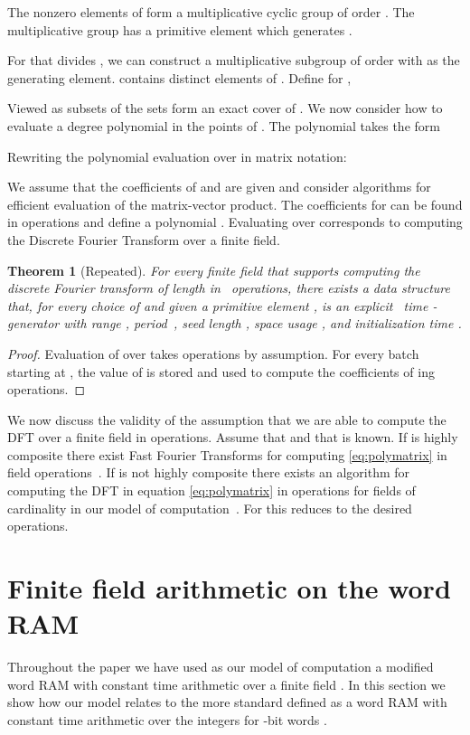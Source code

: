 \documentclass[a4paper,11pt]{article}
\theoremstyle{plain}
\newtheorem{restate}{Theorem}
\theoremstyle{definition}
\begin{document}
The nonzero elements of  form a multiplicative cyclic group  of order . 
The multiplicative group has a primitive element  which generates .

For  that divides , we can construct a multiplicative subgroup  of order  with  as the generating element. 
 contains  distinct elements of . 
Define for , 

Viewed as subsets of  the sets  form an exact cover of . 
We now consider how to evaluate a degree  polynomial  in the points of . The polynomial takes the form

Rewriting the polynomial evaluation over  in matrix notation:

We assume that the coefficients of  and  are given and consider algorithms for efficient evaluation of the matrix-vector product.
The coefficients  for  can be found in  operations and define a polynomial . 
Evaluating  over  corresponds to computing the Discrete Fourier Transform over a finite field.
\begin{restate}[Repeated] 
For every finite field  that supports computing the discrete Fourier transform of length  in~ operations, 
there exists a data structure that, for every choice of  and given a primitive element , 
is an explicit ~time -generator with range , period~, seed length , space usage , and initialization time .
\end{restate}
\begin{proof}
Evaluation of  over  takes  operations by assumption. 
For every batch  starting at , the value of  is stored and used to compute the coefficients of  ing  operations.
\end{proof}
We now discuss the validity of the assumption that we are able to compute the DFT over a finite field in  operations.
Assume that  and that  is known.
If  is highly composite there exist Fast Fourier Transforms for computing \eqref{eq:polymatrix} in  field operations~\cite{duhamel1990}.
If  is not highly composite there exists an algorithm for computing the DFT in equation \eqref{eq:polymatrix} in  operations for fields of cardinality  in our model of computation~\cite{preparata1977}. 
For  this reduces to the desired  operations.
\section{Finite field arithmetic on the word RAM} \label{sec:wordRAM}
Throughout the paper we have used as our model of computation a modified word RAM with constant time arithmetic  over a finite field .
In this section we show how our model relates to the more standard  defined as a word RAM with constant time arithmetic  over the integers  for -bit words \cite{hagerup1998}.
\end{document}
